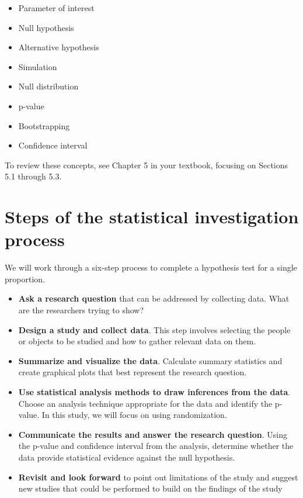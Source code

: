 \documentclass[
]{report}
\begin{document}
\begin{itemize}
\item
  Parameter of interest
\item
  Null hypothesis
\item
  Alternative hypothesis
\item
  Simulation
\item
  Null distribution
\item
  p-value
\item
  Bootstrapping
\item
  Confidence interval
\end{itemize}

To review these concepts, see Chapter 5 in your textbook, focusing on Sections 5.1 through 5.3.

\hypertarget{steps-of-the-statistical-investigation-process}{%
\section{Steps of the statistical investigation process}\label{steps-of-the-statistical-investigation-process}}

We will work through a six-step process to complete a hypothesis test for a single proportion.

\begin{itemize}
\item
  \textbf{Ask a research question} that can be addressed by collecting data. What are the researchers trying to show?
\item
  \textbf{Design a study and collect data}. This step involves selecting the people or objects to be studied and how to gather relevant data on them.
\item
  \textbf{Summarize and visualize the data}. Calculate summary statistics and create graphical plots that best represent the research question.
\item
  \textbf{Use statistical analysis methods to draw inferences from the data}. Choose an analysis technique appropriate for the data and identify the p-value. In this study, we will focus on using randomization.
\item
  \textbf{Communicate the results and answer the research question}. Using the p-value and confidence interval from the analysis, determine whether the data provide statistical evidence against the null hypothesis.
\item
  \textbf{Revisit and look forward} to point out limitations of the study and suggest new studies that could be performed to build on the findings of the study
\end{itemize}
\end{document}
